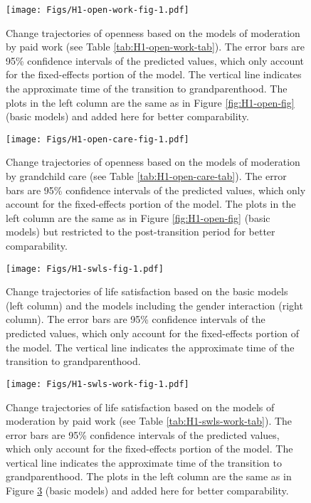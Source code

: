 \documentclass[
  english,
  man,floatsintext]{apa7}
\begin{document}
\begin{figure}
\centering
\texttt{[image: Figs/H1-open-work-fig-1.pdf]}
\caption{\label{fig:H1-open-work-fig}Change trajectories of openness based on the models of moderation by paid work (see Table \ref{tab:H1-open-work-tab}). The error bars are 95\% confidence intervals of the predicted values, which only account for the fixed-effects portion of the model. The vertical line indicates the approximate time of the transition to grandparenthood. The plots in the left column are the same as in Figure \ref{fig:H1-open-fig} (basic models) and added here for better comparability.}
\end{figure}



\begin{figure}
\centering
\texttt{[image: Figs/H1-open-care-fig-1.pdf]}
\caption{\label{fig:H1-open-care-fig}Change trajectories of openness based on the models of moderation by grandchild care (see Table \ref{tab:H1-open-care-tab}). The error bars are 95\% confidence intervals of the predicted values, which only account for the fixed-effects portion of the model. The plots in the left column are the same as in Figure \ref{fig:H1-open-fig} (basic models) but restricted to the post-transition period for better comparability.}
\end{figure}



\begin{figure}
\centering
\texttt{[image: Figs/H1-swls-fig-1.pdf]}
\caption{\label{fig:H1-swls-fig}Change trajectories of life satisfaction based on the basic models (left column) and the models including the gender interaction (right column). The error bars are 95\% confidence intervals of the predicted values, which only account for the fixed-effects portion of the model. The vertical line indicates the approximate time of the transition to grandparenthood.}
\end{figure}



\begin{figure}
\centering
\texttt{[image: Figs/H1-swls-work-fig-1.pdf]}
\caption{\label{fig:H1-swls-work-fig}Change trajectories of life satisfaction based on the models of moderation by paid work (see Table \ref{tab:H1-swls-work-tab}). The error bars are 95\% confidence intervals of the predicted values, which only account for the fixed-effects portion of the model. The vertical line indicates the approximate time of the transition to grandparenthood. The plots in the left column are the same as in Figure \ref{fig:H1-swls-fig} (basic models) and added here for better comparability.}
\end{figure}
\end{document}

